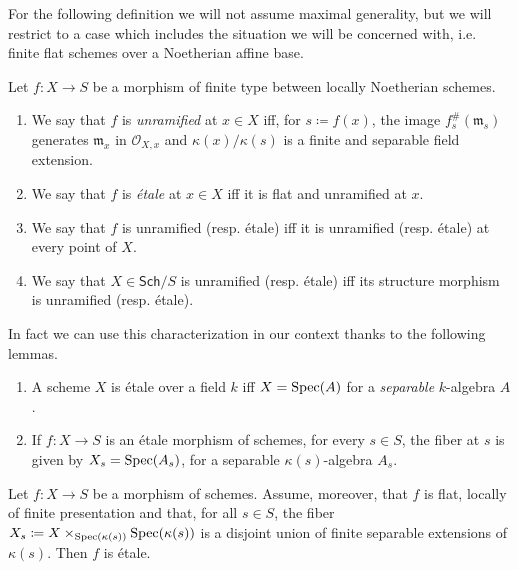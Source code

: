 \noindent
For the following definition we will not assume maximal generality, but
we will restrict to a case which includes the situation we will be concerned with,
i.e$.$ finite flat schemes over a Noetherian affine base.
\begin{defn}\label{defn:EtaleMorphismSheaves}
	Let $f\colon X \to S$ be a morphism of finite type between
	locally Noetherian schemes.
\begin{enumerate}
	\item We say that $f$ is \emph{unramified} at $x \in X$ iff, for $s \coloneqq f(x)$,
		the image $f^{\#}_s(\mathfrak{m}_s)$ generates
		$\mathfrak{m}_x$ in $\mathcal{O}_{ X,x }$
		and $\kappa(x)/\kappa(s)$ is a finite and separable field extension.

	\item We say that $f$ is \emph{étale} at $x \in X$ iff it is
		flat and unramified at $x$.

	\item We say that $f$ is unramified (resp$.$ étale) iff it is 
		unramified (resp$.$ étale) at every point of $X$.

	\item We say that $X \in \mathsf{Sch}/S$ is unramified 
		(resp$.$ étale) iff its structure
		morphism is unramified (resp$.$ étale).
\end{enumerate}
\end{defn}


\noindent
In fact we can use this characterization in our context thanks to the following lemmas.
\begin{lem}
	\leavevmode\vspace{-.2\baselineskip}
\begin{enumerate}
	\item A scheme $X$ is étale over a field $k$ iff $X = \operatorname{Spec}(A)$
		for a \emph{separable} $k$-algebra $A$.
	\item If $f\colon X \to S$ is an étale morphism of schemes,
		for every $s \in S$, the fiber at $s$ is given by $X_s = \operatorname{Spec}(A_s)$,
		for a separable $\kappa(s)$-algebra $A_s$.
\end{enumerate}
\end{lem} 


\begin{lem}
	\label{FlatMorphismEtaleViaFIbers}
	Let $f\colon X \to S$ be a morphism of schemes.
	Assume, moreover, that $f$ is flat, locally of finite presentation and that,
	for all $s \in S$, the fiber $X_s \coloneqq 
	X \times_{\operatorname{Spec}(\kappa(s))} \operatorname{Spec}(\kappa(s))$
	is a disjoint union of finite separable extensions of $\kappa(s)$.
	Then $f$ is étale.
\end{lem} 


